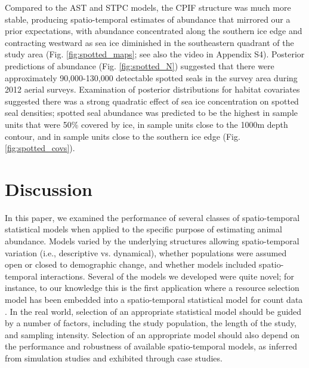 \documentclass[times,mee,doublespace,]{besauth2}
\begin{document}
Compared to the AST and STPC models, the CPIF structure was much more stable, producing spatio-temporal estimates of abundance that mirrored our a prior expectations, with abundance concentrated along the southern ice edge and contracting westward as sea ice diminished in the southeastern quadrant of the study area (Fig. \ref{fig:spotted_maps}; see also the video in Appendix S4).  Posterior predictions of abundance (Fig. \ref{fig:spotted_N}) suggested that there were approximately 90,000-130,000 detectable spotted seals in the survey area during 2012 aerial surveys.  Examination of posterior distributions for habitat covariates suggested there was a strong quadratic effect of sea ice concentration on spotted seal densities; spotted seal abundance was predicted to be the highest in sample units that were 50\% covered by ice, in sample units close to the 1000m depth contour, and in sample units close to the southern ice edge (Fig. \ref{fig:spotted_covs}).

\section{Discussion}

In this paper, we examined the performance of several classes of spatio-temporal statistical models when applied to the specific purpose of estimating animal abundance.  Models varied by the underlying structures allowing spatio-temporal variation (i.e., descriptive vs. dynamical), whether populations were assumed open or closed to demographic change, and whether models included spatio-temporal interactions.  Several of the models we developed were quite novel; for instance, to our knowledge this is the first application where a resource selection model has been embedded into a spatio-temporal statistical model for count data \citep[although see][for an example integrating resource selection into capture-recapture models]{RoyleEtAl2013}.  In the real world, selection of an appropriate statistical model should be guided by a number of factors, including the study population, the length of the study, and sampling intensity.  Selection of an appropriate model should also depend on the performance and robustness of available spatio-temporal models, as inferred from simulation studies and exhibited through case studies.
\end{document}
